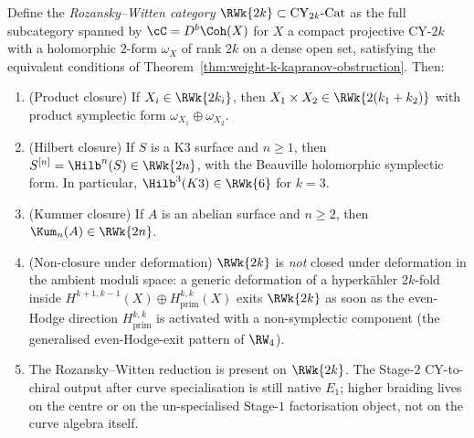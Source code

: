 \begin{theorem}
\label{thm:rw-2k-category}
%
Define the \emph{Rozansky--Witten category}
$\RWk{2k} \subset \mathrm{CY}_{2k}\text{-Cat}$ as the full subcategory
spanned by \(\cC=D^b\Coh(X)\) for \(X\) a compact projective CY-\(2k\)
with a holomorphic \(2\)-form \(\omega_X\) of rank \(2k\) on a dense open
set, satisfying the equivalent
conditions of Theorem~\ref{thm:weight-k-kapranov-obstruction}. Then:
\begin{enumerate}[label=\textup{(}\roman*\textup{)}]
 \item \textup{(}Product closure\textup{)} If
 \(X_i\in\RWk{2k_i}\), then \(X_1\times X_2\in\RWk{2(k_1+k_2)}\) with
 product symplectic form \(\omega_{X_1}\oplus\omega_{X_2}\).
 \item \textup{(}Hilbert closure\textup{)} If $S$ is a K$3$ surface and
 \(n \ge 1\), then \(S^{[n]}=\Hilb^n(S)\in\RWk{2n}\), with the
 Beauville holomorphic symplectic form. In particular,
 $\Hilb^3(K3) \in \RWk{6}$ for $k=3$.
 \item \textup{(}Kummer closure\textup{)} If $A$ is an abelian surface and
 $n \ge 2$, then $\Kum_n(A) \in \RWk{2n}$.
 \item \textup{(}Non-closure under deformation\textup{)} $\RWk{2k}$ is
 \emph{not} closed under deformation in the ambient moduli space: a
 generic deformation of a hyperk\"ahler $2k$-fold inside
 $H^{k+1,k-1}(X) \oplus H^{k,k}_{\mathrm{prim}}(X)$ exits $\RWk{2k}$ as
 soon as the even-Hodge direction $H^{k,k}_{\mathrm{prim}}$ is activated
 with a non-symplectic component \textup{(}the generalised
 even-Hodge-exit pattern of $\RW_4$\textup{).}
 \item The Rozansky--Witten reduction is present on \(\RWk{2k}\). The
 Stage-$2$ CY-to-chiral output after curve specialisation is still native
 \(E_1\); higher braiding lives on the centre or on the un-specialised
 Stage-$1$ factorisation object, not on the curve algebra itself.
\end{enumerate}
\end{theorem}

